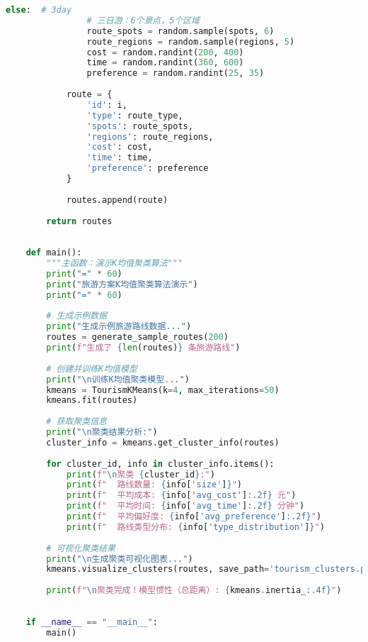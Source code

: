 \begin{lstlisting}[language=Python]
            else:  # 3day
                # 三日游：6个景点，5个区域
                route_spots = random.sample(spots, 6)
                route_regions = random.sample(regions, 5)
                cost = random.randint(200, 400)
                time = random.randint(360, 600)
                preference = random.randint(25, 35)
            
            route = {
                'id': i,
                'type': route_type,
                'spots': route_spots,
                'regions': route_regions,
                'cost': cost,
                'time': time,
                'preference': preference
            }
            
            routes.append(route)
        
        return routes
    
    
    def main():
        """主函数：演示K均值聚类算法"""
        print("=" * 60)
        print("旅游方案K均值聚类算法演示")
        print("=" * 60)
        
        # 生成示例数据
        print("生成示例旅游路线数据...")
        routes = generate_sample_routes(200)
        print(f"生成了 {len(routes)} 条旅游路线")
        
        # 创建并训练K均值模型
        print("\n训练K均值聚类模型...")
        kmeans = TourismKMeans(k=4, max_iterations=50)
        kmeans.fit(routes)
        
        # 获取聚类信息
        print("\n聚类结果分析:")
        cluster_info = kmeans.get_cluster_info(routes)
        
        for cluster_id, info in cluster_info.items():
            print(f"\n聚类 {cluster_id}:")
            print(f"  路线数量: {info['size']}")
            print(f"  平均成本: {info['avg_cost']:.2f} 元")
            print(f"  平均时间: {info['avg_time']:.2f} 分钟")
            print(f"  平均偏好度: {info['avg_preference']:.2f}")
            print(f"  路线类型分布: {info['type_distribution']}")
        
        # 可视化聚类结果
        print("\n生成聚类可视化图表...")
        kmeans.visualize_clusters(routes, save_path='tourism_clusters.png')
        
        print(f"\n聚类完成！模型惯性（总距离）: {kmeans.inertia_:.4f}")
    
    
    if __name__ == "__main__":
        main()
    
\end{lstlisting}



